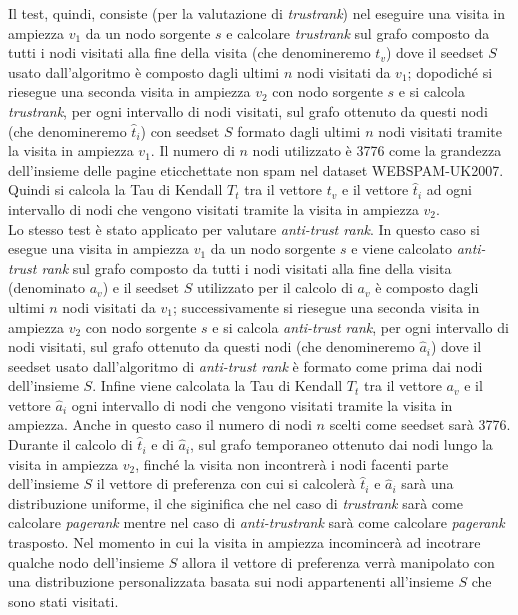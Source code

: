 Il test, quindi, consiste (per la valutazione di \textit{trustrank}) nel eseguire una visita in ampiezza \(v_1\) da un nodo sorgente \(s\) e calcolare \textit{trustrank} sul grafo composto da tutti i nodi visitati alla fine della visita (che denomineremo \(t_v\)) dove il seedset \(S\) usato dall'algoritmo è composto dagli ultimi \(n\) nodi visitati da \(v_1\); dopodiché  si riesegue una seconda visita in ampiezza \(v_2\) con nodo sorgente \(s\) e si calcola \textit{trustrank}, per ogni intervallo di nodi visitati, sul grafo ottenuto da questi nodi (che denomineremo \(\hat{t}_i\)) con seedset \(S\) formato dagli ultimi \(n\) nodi visitati tramite la visita in ampiezza \(v_1\). Il numero di \(n\) nodi utilizzato è 3776 come la grandezza dell'insieme delle pagine eticchettate non spam nel dataset WEBSPAM-UK2007. Quindi si calcola la Tau di Kendall \(T_t\) tra il vettore \(t_v\) e il vettore \(\hat{t}_i\) ad ogni intervallo di nodi che vengono visitati tramite la visita in ampiezza \(v_2\).\\
Lo stesso test è stato applicato per valutare \textit{anti-trust rank}. In questo caso si esegue una visita in ampiezza \(v_1\) da un nodo sorgente \(s\) e viene calcolato \textit{anti-trust rank} sul grafo composto da tutti i nodi visitati alla fine della visita (denominato \(a_v\)) e il seedset \(S\) utilizzato per il calcolo di \(a_v\) è composto dagli ultimi \(n\) nodi visitati da \(v_1\); successivamente si riesegue una seconda visita in ampiezza \(v_2\) con nodo sorgente \(s\) e si calcola \textit{anti-trust rank}, per ogni intervallo di nodi visitati, sul grafo ottenuto da questi nodi (che denomineremo \(\hat{a}_i\)) dove il seedset usato dall'algoritmo di \textit{anti-trust rank} è formato come prima dai nodi dell'insieme \(S\). Infine  viene calcolata la Tau di Kendall \(T_t\) tra il vettore \(a_v\) e il vettore \(\hat{a}_i\) ogni intervallo di nodi che vengono visitati tramite la visita in ampiezza. Anche in questo caso il numero di nodi \(n\) scelti come seedset sarà 3776.\\
Durante il calcolo di \(\hat{t}_i\) e di \(\hat{a}_i\), sul grafo temporaneo ottenuto dai nodi lungo la visita in ampiezza \(v_2\), finché la visita non incontrerà i nodi facenti parte dell'insieme \(S\) il vettore di preferenza con cui si calcolerà \(\hat{t}_i\) e \(\hat{a}_i\) sarà una distribuzione uniforme, il che siginifica che nel caso di \textit{trustrank} sarà come calcolare \textit{pagerank} mentre nel caso di \textit{anti-trustrank} sarà come calcolare \textit{pagerank} trasposto. Nel momento in cui la visita in ampiezza incomincerà ad incotrare qualche nodo dell'insieme \(S\) allora il vettore di preferenza verrà manipolato con una distribuzione personalizzata basata sui nodi appartenenti all'insieme \(S\) che sono stati visitati. 


